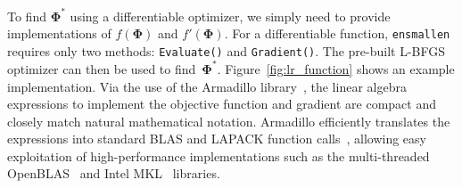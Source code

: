 \documentclass[twoside,11pt]{article}
\begin{document}

To find $\bm \Phi^*$ using a differentiable optimizer,
we simply need to provide implementations of $f(\bm \Phi)$ and $f'(\bm \Phi)$.
For a differentiable function, {\tt ensmallen} requires only two methods:
{\tt Evaluate()} and {\tt Gradient()}.
The pre-built L-BFGS optimizer can then be used to find~$\bm \Phi^*$.
Figure~\ref{fig:lr_function} shows an example implementation.
Via the use of the Armadillo library~\citep{sanderson2016armadillo},
the linear algebra expressions to implement the objective function and gradient
are compact and closely match natural mathematical notation.
Armadillo efficiently translates the expressions into standard BLAS and LAPACK function calls~\citep{anderson1999lapack},
allowing easy exploitation of high-performance implementations such as the multi-threaded \mbox{OpenBLAS}~\citep{OpenBLAS} and Intel MKL~\citep{IntelMKL} libraries.






\end{document}
